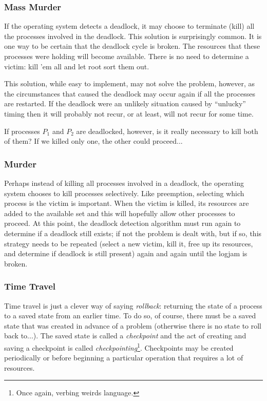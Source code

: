 \documentclass[a4paper]{report}
\begin{document}
\subsubsection*{Mass Murder}
If the operating system detects a deadlock, it may choose to terminate (kill) all the processes involved in the deadlock. This solution is surprisingly common. It is one way to be certain that the deadlock cycle is broken. The resources that these processes were holding will become available. There is no need to determine a victim: kill 'em all and let root sort them out.

This solution, while easy to implement, may not solve the problem, however, as the circumstances that caused the deadlock may occur again if all the processes are restarted. If the deadlock were an unlikely situation caused by ``unlucky'' timing then it will probably not recur, or at least, will not recur for some time.

If processes $P_{1}$ and $P_{2}$ are deadlocked, however, is it really necessary to kill both of them? If we killed only one, the other could proceed...

\subsubsection*{Murder}
Perhaps instead of killing all processes involved in a deadlock, the operating system chooses to kill processes selectively. Like preemption, selecting which process is the victim is important. When the victim is killed, its resources are added to the available set and this will hopefully allow other processes to proceed. At this point, the deadlock detection algorithm must run again to determine if a deadlock still exists; if not the problem is dealt with, but if so, this strategy needs to be repeated (select a new victim, kill it, free up its resources, and determine if deadlock is still present) again and again until the logjam is broken.



\subsubsection*{Time Travel}
Time travel is just a clever way of saying \textit{rollback}: returning the state of a process to a saved state from an earlier time. To do so, of course, there must be a saved state that was created in advance of a problem (otherwise there is no state to roll back to...). The saved state is called a \textit{checkpoint} and the act of creating and saving a checkpoint is called \textit{checkpointing}\footnote{Once again, verbing weirds language.}. Checkpoints may be created periodically or before beginning a particular operation that requires a lot of resources.
\end{document}
